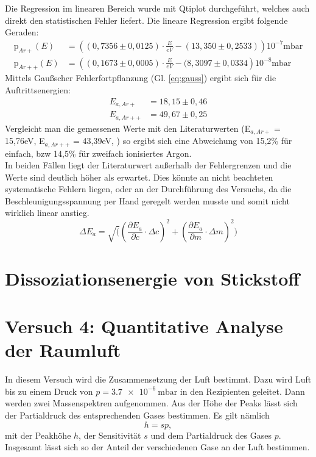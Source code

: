 Die Regression im linearen Bereich wurde mit Qtiplot durchgeführt, welches auch direkt den statistischen Fehler liefert. Die lineare Regression ergibt folgende Geraden:
\begin{align}
	\textrm{p}_{Ar+}(E) &= \left((0,7356\pm 0,0125)\cdot\frac{E}{eV} - (13,350\pm 0,2533)\right)10^{-7}\textrm{mbar}\\
	\textrm{p}_{Ar++}(E) &= \left((0,1673\pm 0,0005)\cdot\frac{E}{eV} - (8,3097\pm 0,0334\right)10^{-8}\textrm{mbar}
\end{align}
Mittels Gaußscher Fehlerfortpflanzung (Gl. \ref{eq:gauss}) ergibt sich für die Auftrittsenergien:
\begin{align}
	E_{a,Ar+} &= 18,15\pm 0,46\\
	E_{a,Ar++} &= 49,67\pm 0,25
\end{align}
Vergleicht man die gemessenen Werte mit den Literaturwerten (E$_{a,Ar+}$ = 15,76\;eV, E$_{a,Ar++}$ = 43,39\;eV, \cite{Litmap}) so ergibt sich eine Abweichung von 15,2\;\% für einfach, bzw 14,5\;\% für zweifach ionisiertes Argon.\\
In beiden Fällen liegt der Literaturwert außerhalb der Fehlergrenzen und die Werte sind deutlich höher als erwartet. Dies könnte an nicht beachteten systematische Fehlern liegen, oder an der Durchführung des Versuchs, da die Beschleunigungsspannung per Hand geregelt werden musste und somit nicht wirklich linear anstieg.\\
\begin{equation}
	\Delta E_a = \sqrt(\left(\frac{\partial E_a}{\partial c}\cdot\Delta c\right)^2 + \left(\frac{\partial E_a}{\partial m}\cdot\Delta m\right)^2)
	\label{eq:gauss}
\end{equation}
\section{Dissoziationsenergie von Stickstoff}



\section{Versuch 4: Quantitative Analyse der Raumluft}

In diesem Versuch wird die Zusammensetzung der Luft bestimmt. Dazu wird Luft bis zu einem Druck von $p=\SI{3,7e-6}{\milli\bar}$ in den Rezipienten geleitet. Dann werden zwei Massenspektren aufgenommen. Aus der Höhe der Peaks lässt sich der Partialdruck des entsprechenden Gases bestimmen. Es gilt nämlich
\begin{equation}
 h = sp,
\end{equation}
mit der Peakhöhe $h$, der Sensitivität $s$ und dem Partialdruck des Gases $p$. Insgesamt lässt sich so der Anteil der verschiedenen Gase an der Luft bestimmen.

